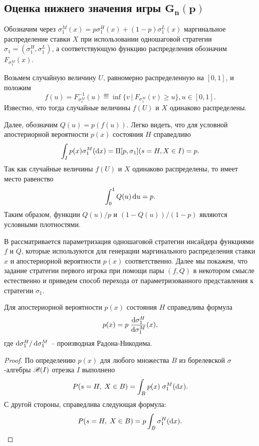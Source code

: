 {\subsection{Оценка нижнего значения игры $\mathbf{ G_{n}(p) }$}
\label{ch3:sec:-primal-game}

Обозначим через $\sigma^M_1(x) = p \sigma^H_1(x) + (1-p) \sigma^L_1(x)$ маргинальное распределение ставки $X$ при использовании одношаговой стратегии $\sigma_1 = (\sigma^H_1, \sigma^L_1)$, а соответствующую функцию распределения обозначим $F_{\sigma^M_1}(x)$.

Возьмем случайную величину $U$, равномерно распределенную на $[0, 1]$, и положим
\begin{equation*}
  f(u) = F^{-1}_{\sigma^M_1}(u) \eqdef \inf \{ v\ |\ F_{\sigma^M_1}(v) \geq u \}, u \in [0, 1].
\end{equation*}
Известно, что тогда случайные величины $f(U)$ и $X$ одинаково распределены.

Далее, обозначим $Q(u) = p(f(u))$.
Легко видеть, что для условной апостериорной вероятности $p(x)$ состояния $H$ справедливо
\begin{equation*}
  \int_I p(x) \sigma^M_1(\mathop{}\!\mathrm{d} x) = \Pi[p, \sigma_1](s = H, X \in I) = p.
\end{equation*}
Так как случайные величины $f(U)$ и $X$ одинаково распределены, то имеет место равенство
\begin{equation*}
  \int_0^1 Q(u) \mathop{}\!\mathrm{d} u = p.
\end{equation*}
Таким образом, функции $Q(u)/p$ и $(1-Q(u))/(1-p)$ являются условными плотностями.

В \cite{demeyer02} рассматривается параметризация одношаговой стратегии инсайдера функциями $f$ и $Q$, которые используются для генерации маргинального распределения ставки $x$ и апостериорной вероятности $p(x)$ соответственно.
Далее мы покажем, что задание стратегии первого игрока при помощи пары $(f, Q)$ в некотором смысле естественно и приведем способ перехода от параметризованного представления к стратегии $\sigma_1$.

\begin{proposition}
  Для апостериорной вероятности $p(x)$ состояния $H$ справедлива формула
  \begin{equation}\label{ch3:eq:p(x)}
    p(x) = p \; \frac{\mathop{}\!\mathrm{d} \sigma^H_1}{\mathop{}\!\mathrm{d} \sigma^M_1}(x),
  \end{equation}
  где $\mathop{}\!\mathrm{d} \sigma^H_1/\mathop{}\!\mathrm{d} \sigma^M_1$ -- производная Радона-Никодима.
\end{proposition}
\begin{proof}
  По определению $p(x)$ для любого множества $B$ из борелевской $\sigma$-алгебры $\mathscr{B}(I)$ отрезка $I$ выполнено
  \begin{equation*}
    P(s = H, \; X \in B) = \int_B p(x) \; \sigma^M_1(\mathop{}\!\mathrm{d} x).
  \end{equation*}
  С другой стороны, справедлива следующая формула:
  \begin{equation*}
    P(s = H, \; X \in B) = p \int_B \sigma^H_1(\mathop{}\!\mathrm{d} x).
  \end{equation*}


\end{proof}}
